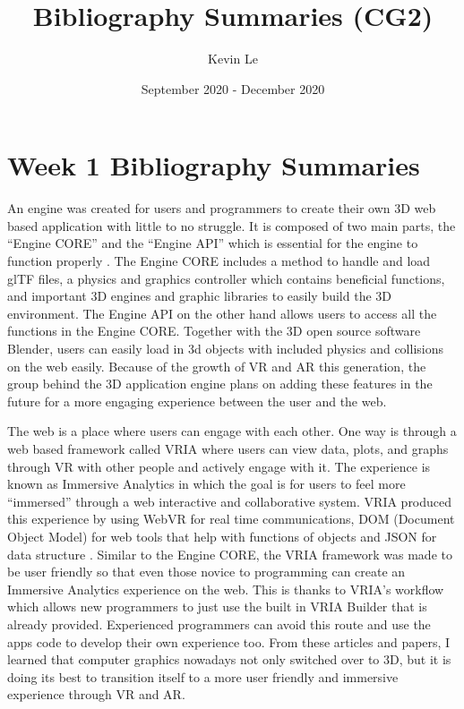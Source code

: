 \documentclass{article}
\title{Bibliography Summaries (CG2)}
\author{Kevin Le}
\date{September 2020 - December 2020}
\begin{document}
\maketitle

\section{Week 1 Bibliography Summaries}

	An engine was created for users and programmers to create their own 3D web based application with little to no struggle. It is composed of two main parts, the “Engine CORE” and the “Engine API” which is essential for the engine to function properly \cite{8955392}. The Engine CORE includes a method to handle and load glTF files, a physics and graphics controller which contains beneficial functions, and important 3D engines and graphic libraries to easily build the 3D environment. The Engine API on the other hand allows users to access all the functions in the Engine CORE. Together with the 3D open source software Blender, users can easily load in 3d objects with included physics and collisions on the web easily. Because of the growth of VR and AR this generation, the group behind the 3D application engine plans on adding these features in the future for a more engaging experience between the user and the web.
	
	The web is a place where users can engage with each other. One way is through a web based framework called VRIA where users can view data, plots, and graphs through VR with other people and actively engage with it. The experience is known as Immersive Analytics in which the goal is for users to feel more “immersed” through a web interactive and collaborative system. VRIA produced this experience by using WebVR for real time communications, DOM (Document Object Model) for web tools that help with functions of objects and JSON for data structure \cite{8954824}. Similar to the Engine CORE, the VRIA framework was made to be user friendly so that even those novice to programming can create an Immersive Analytics experience on the web. This is thanks to VRIA’s workflow which allows new programmers to just use the built in VRIA Builder that is already provided. Experienced programmers can avoid this route and use the apps code to develop their own experience too. From these articles and papers, I learned that computer graphics nowadays not only switched over to 3D, but it is doing its best to transition itself to a more user friendly and immersive experience through VR and AR. 
\end{document}
